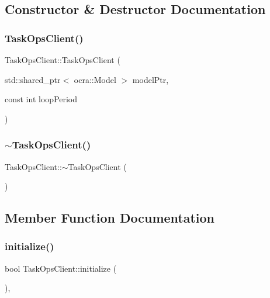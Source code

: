 \subsection{Constructor \& Destructor Documentation}
\hypertarget{classTaskOpsClient_a6d3842de3255a78526ced7953428452c}{}\label{classTaskOpsClient_a6d3842de3255a78526ced7953428452c} 
\subsubsection{\texorpdfstring{Task\+Ops\+Client()}{TaskOpsClient()}}
{\footnotesize\ttfamily Task\+Ops\+Client\+::\+Task\+Ops\+Client (\begin{DoxyParamCaption}\item[{std\+::shared\+\_\+ptr$<$ ocra\+::\+Model $>$}]{model\+Ptr,  }\item[{const int}]{loop\+Period }\end{DoxyParamCaption})}

\hypertarget{classTaskOpsClient_a80a5c71dd04ab7a07d4ffb8116244cdd}{}\label{classTaskOpsClient_a80a5c71dd04ab7a07d4ffb8116244cdd} 
\subsubsection{\texorpdfstring{$\sim$\+Task\+Ops\+Client()}{~TaskOpsClient()}}
{\footnotesize\ttfamily Task\+Ops\+Client\+::$\sim$\+Task\+Ops\+Client (\begin{DoxyParamCaption}{ }\end{DoxyParamCaption})\hspace{0.3cm}{\ttfamily [virtual]}}



\subsection{Member Function Documentation}
\hypertarget{classTaskOpsClient_a6f5e4c20c1d5f5df28dcc58e3cb4adb0}{}\label{classTaskOpsClient_a6f5e4c20c1d5f5df28dcc58e3cb4adb0} 
\subsubsection{\texorpdfstring{initialize()}{initialize()}}
{\footnotesize\ttfamily bool Task\+Ops\+Client\+::initialize (\begin{DoxyParamCaption}{ }\end{DoxyParamCaption})\hspace{0.3cm}{\ttfamily [protected]}, {\ttfamily [virtual]}}

